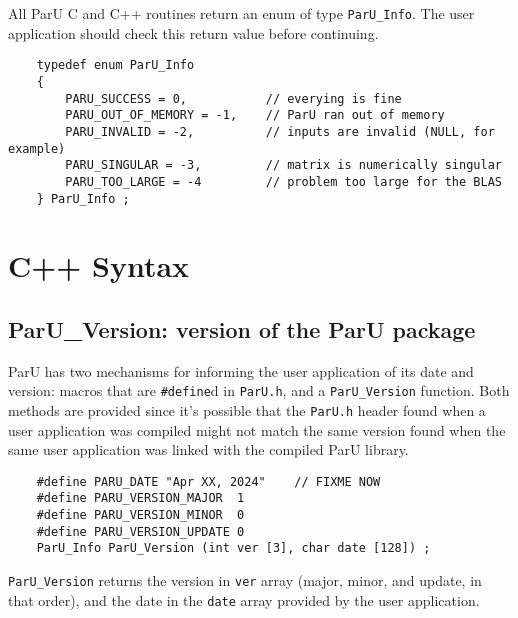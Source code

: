 \documentclass[12pt]{article}
\begin{document}
    All ParU C and C++ routines return an enum of type \verb'ParU_Info'.  The
    user application should check this return value before continuing.

    {\footnotesize
    \begin{verbatim}
    typedef enum ParU_Info
    {
        PARU_SUCCESS = 0,           // everying is fine
        PARU_OUT_OF_MEMORY = -1,    // ParU ran out of memory
        PARU_INVALID = -2,          // inputs are invalid (NULL, for example)
        PARU_SINGULAR = -3,         // matrix is numerically singular
        PARU_TOO_LARGE = -4         // problem too large for the BLAS
    } ParU_Info ; \end{verbatim}}

\section{C++ Syntax}

\subsection{{\sf ParU\_Version}: version of the ParU package}

    ParU has two mechanisms for informing the user application of its date and
    version: macros that are \verb'#define'd in \verb'ParU.h', and a
    \verb'ParU_Version' function.  Both methods are provided since it's
    possible that the \verb'ParU.h' header found when a user application was
    compiled might not match the same version found when the same user
    application was linked with the compiled ParU library.

    {\footnotesize
    \begin{verbatim}
    #define PARU_DATE "Apr XX, 2024"    // FIXME NOW
    #define PARU_VERSION_MAJOR  1
    #define PARU_VERSION_MINOR  0
    #define PARU_VERSION_UPDATE 0
    ParU_Info ParU_Version (int ver [3], char date [128]) ; \end{verbatim}}

    \verb'ParU_Version' returns the version in \verb'ver' array (major, minor,
    and update, in that order), and the date in the \verb'date' array provided
    by the user application.
\end{document}
